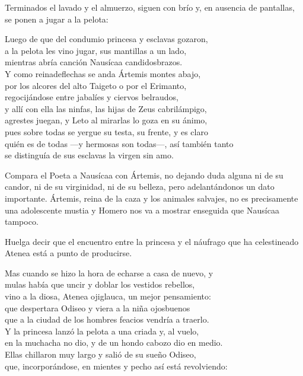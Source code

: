 Terminados el lavado y el almuerzo, siguen con brío y, en ausencia de pantallas, se ponen a jugar a la pelota:

\begin{versocita}
Luego de que del condumio princesa y esclavas gozaron,\\
a la pelota les vino jugar, sus mantillas a un lado,\\
mientras abría canción Nausícaa candidosbrazos.\\
Y como reinadeflechas se anda Ártemis montes abajo,\\
por los alcores del alto Taigeto o por el Erimanto,\\
regocijándose entre jabalíes y ciervos belraudos,\\
y allí con ella las ninfas, las hijas de Zeus cabrilámpigo,\\
agrestes juegan, y Leto al mirarlas lo goza en su ánimo,\\
pues sobre todas se yergue su testa, su frente, y es claro\\
quién es de todas ---y hermosas son todas---, así también tanto\\
se distinguía de sus esclavas la virgen sin amo.
\end{versocita}

Compara el Poeta a Nausícaa con Ártemis, no dejando duda alguna ni de su candor, ni de su virginidad, ni de su belleza, pero adelantándonos un dato importante. Ártemis, reina de la caza y los animales salvajes, no es precisamente una adolescente mustia y Homero nos va a mostrar enseguida que Nausícaa tampoco.

Huelga decir que el encuentro entre la princesa y el náufrago que ha celestineado Atenea está a punto de producirse.

\begin{versocita}
Mas cuando se hizo la hora de echarse a casa de nuevo, y\\
mulas había que uncir y doblar los vestidos rebellos,\\
vino a la diosa, Atenea ojiglauca, un mejor pensamiento:\\
que despertara Odiseo y viera a la niña ojosbuenos\\
que a la ciudad de los hombres feacios vendría a traerlo.\\
Y la princesa lanzó la pelota a una criada y, al vuelo,\\
en la muchacha no dio, y de un hondo cabozo dio en medio.\\
Ellas chillaron muy largo y salió de su sueño Odiseo,\\
que, incorporándose, en mientes y pecho así está revolviendo:
\end{versocita}

